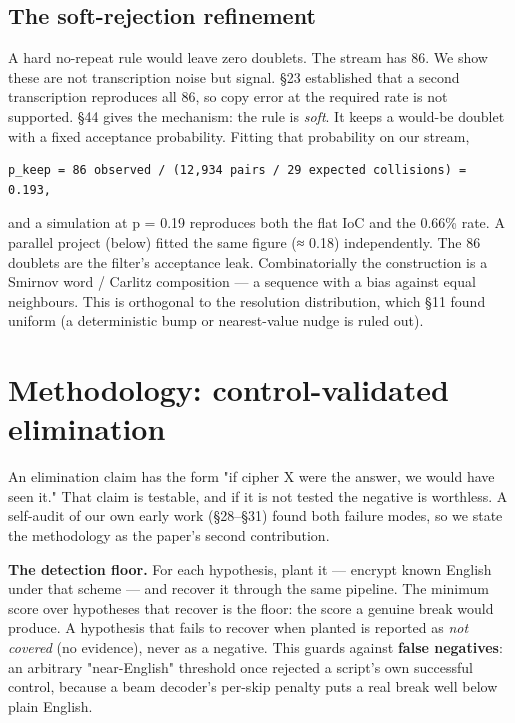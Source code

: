 \documentclass[11pt]{article}
\begin{document}
\subsection{The soft-rejection refinement}

A hard no-repeat rule would leave zero doublets. The stream has 86. We show these are not transcription noise but signal. §23 established that a second transcription reproduces all 86, so copy error at the required rate is not supported. §44 gives the mechanism: the rule is \emph{soft}. It keeps a would-be doublet with a fixed acceptance probability. Fitting that probability on our stream,


\begin{verbatim}
p_keep = 86 observed / (12,934 pairs / 29 expected collisions) = 0.193,
\end{verbatim}

and a simulation at p = 0.19 reproduces both the flat IoC and the 0.66\% rate. A parallel project (below) fitted the same figure (≈ 0.18) independently. The 86 doublets are the filter's acceptance leak. Combinatorially the construction is a Smirnov word / Carlitz composition — a sequence with a bias against equal neighbours. This is orthogonal to the resolution distribution, which §11 found uniform (a deterministic bump or nearest-value nudge is ruled out).


\section{Methodology: control-validated elimination}

An elimination claim has the form "if cipher X were the answer, we would have seen it." That claim is testable, and if it is not tested the negative is worthless. A self-audit of our own early work (§28–§31) found both failure modes, so we state the methodology as the paper's second contribution.


\textbf{The detection floor.} For each hypothesis, plant it — encrypt known English under that scheme — and recover it through the same pipeline. The minimum score over hypotheses that recover is the floor: the score a genuine break would produce. A hypothesis that fails to recover when planted is reported as \emph{not covered} (no evidence), never as a negative. This guards against \textbf{false negatives}: an arbitrary "near-English" threshold once rejected a script's own successful control, because a beam decoder's per-skip penalty puts a real break well below plain English.
\end{document}
